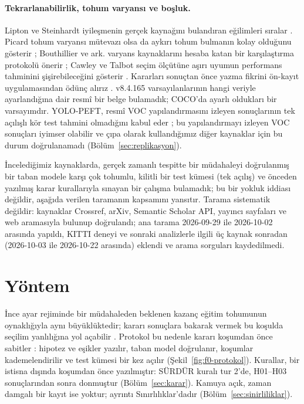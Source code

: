 \documentclass[pdflatex,iicol,sn-mathphys-num]{sn-jnl}
\begin{document}
\paragraph{Tekrarlanabilirlik, tohum varyansı ve boşluk.}
Lipton ve Steinhardt iyileşmenin gerçek kaynağını bulandıran eğilimleri sıralar \cite{lipton_2019_troubling}. Picard tohum varyansı mütevazı olsa da aykırı tohum bulmanın kolay olduğunu gösterir \cite{picard_2021_seed}; Bouthillier ve ark. varyans kaynaklarını hesaba katan bir karşılaştırma protokolü önerir \cite{bouthillier_2021_variance}; Cawley ve Talbot seçim ölçütüne aşırı uyumun performans tahminini şişirebileceğini gösterir \cite{cawley_2010_overfitting}. Kararları sonuçtan önce yazma fikrini ön-kayıt uygulamasından ödünç alırız \cite{nosek_2018_preregistration}. v8.4.165 varsayılanlarının hangi veriyle ayarlandığına dair resmî bir belge bulamadık; COCO'da ayarlı oldukları bir varsayımdır. YOLO-PEFT, resmî VOC yapılandırmasını izleyen sonuçlarının tek açılışlı kör test tahmini olmadığını kabul eder \cite{lin_2026_yolopeft}; bu yapılandırmayı izleyen VOC sonuçları iyimser olabilir ve çıpa olarak kullandığımız diğer kaynaklar için bu durum doğrulanamadı (Bölüm~\ref{sec:replikasyon}).

İncelediğimiz kaynaklarda, gerçek zamanlı tespitte bir müdahaleyi doğrulanmış bir taban modele karşı çok tohumlu, kilitli bir test kümesi (tek açılış) ve önceden yazılmış karar kurallarıyla sınayan bir çalışma bulamadık; bu bir yokluk iddiası değildir, aşağıda verilen taramanın kapsamını yansıtır. Tarama sistematik değildir: kaynaklar Crossref, arXiv, Semantic Scholar API, yayıncı sayfaları ve web aramasıyla bulunup doğrulandı; ana tarama 2026-09-29 ile 2026-10-02 arasında yapıldı, KITTI deneyi ve sonraki analizlerle ilgili üç kaynak sonradan (2026-10-03 ile 2026-10-22 arasında) eklendi ve arama sorguları kaydedilmedi.

\section{Yöntem}\label{sec:yontem}

{%
}

İnce ayar rejiminde bir müdahaleden beklenen kazanç eğitim tohumunun oynaklığıyla aynı büyüklüktedir; kararı sonuçlara bakarak vermek bu koşulda seçilim yanlılığına yol açabilir \cite{cawley_2010_overfitting,bouthillier_2021_variance}. Protokol bu nedenle kararı koşumdan önce sabitler \cite{nosek_2018_preregistration}: hipotez ve eşikler yazılır, taban model doğrulanır, koşumlar kademelendirilir ve test kümesi bir kez açılır (Şekil~\ref{fig:f0-protokol}). Kurallar, bir istisna dışında koşumdan önce yazılmıştır: SÜRDÜR kuralı tur 2'de, H01--H03 sonuçlarından sonra donmuştur (Bölüm~\ref{sec:karar}). Kamuya açık, zaman damgalı bir kayıt ise yoktur; ayrıntı Sınırlılıklar'dadır (Bölüm~\ref{sec:sinirliliklar}).
\end{document}
